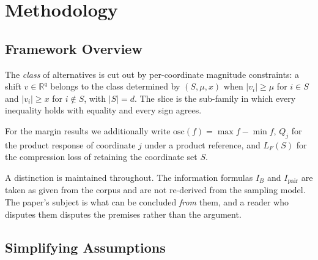 \section{Methodology}
\label{sec:setting}

\subsection{Framework Overview}

The \emph{class} of alternatives is cut out by per-coordinate magnitude constraints: a shift
$v\in\mathbb{R}^{q}$ belongs to the class determined by $(S,\mu,x)$ when $|v_{i}|\ge\mu$ for
$i\in S$ and $|v_{i}|\ge x$ for $i\notin S$, with $|S|=d$. The slice is the sub-family in
which every inequality holds with equality and every sign agrees.

For the margin results we additionally write $\mathrm{osc}(f)=\max f-\min f$, $Q_{j}$ for the
product response of coordinate $j$ under a product reference, and $L_{F}(S)$ for the
compression loss of retaining the coordinate set $S$.

A distinction is maintained throughout. The information formulas $I_{B}$ and
$I_{\mathrm{pair}}$ are taken as given from the corpus and are not re-derived from the
sampling model. The paper's subject is what can be concluded \emph{from} them, and a reader
who disputes them disputes the premises rather than the argument.

\subsection{Simplifying Assumptions}

